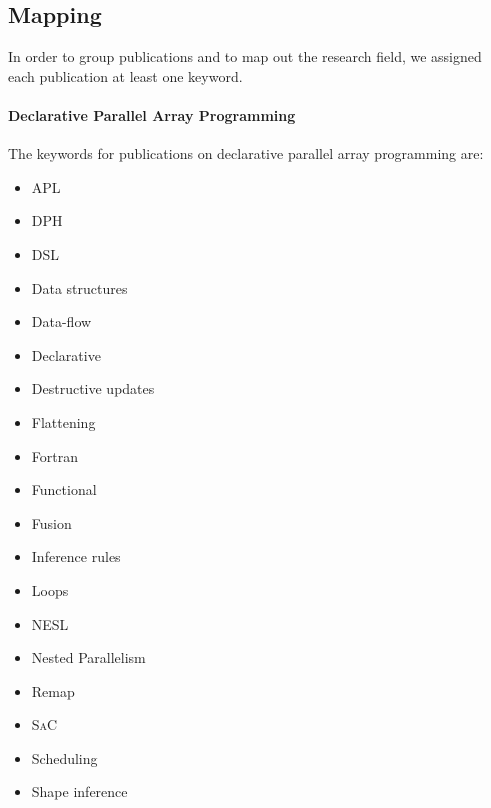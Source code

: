 \documentclass[a4paper]{article}
\newcommand{\sac}{S\textsc{a}C}
\begin{document}
\subsection{Mapping}
\label{sec:mapping}

In order to group publications and to map out the research field, we
assigned each publication at least one keyword.

\paragraph{Declarative Parallel Array Programming}

The keywords for publications on declarative parallel array
programming are:

\begin{multicols}{2}

\begin{itemize}
\item APL
\item DPH
\item DSL
\item Data structures
\item Data-flow
\item Declarative
\item Destructive updates
\item Flattening
\item Fortran
\item Functional
\item Fusion
\item Inference rules
\item Loops
\item NESL
\item Nested Parallelism
\item Remap
\item \sac{}
\item Scheduling
\item Shape inference
\end{itemize}

\end{multicols}
\end{document}
